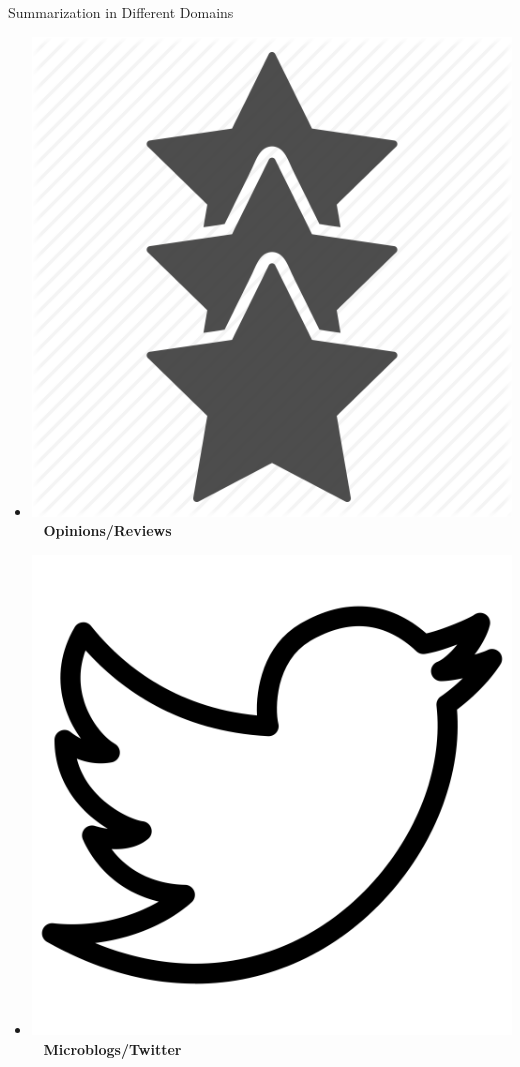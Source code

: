 \documentclass[xcolor={table}]{beamer}
\begin{document}
\begin{frame}{Summarization in Different Domains}
\begin{itemize}
\item[] \includegraphics[scale=.02]{rating_icon}~ \textbf{Opinions/Reviews} {\tiny\cite{titov2008joint}}
\item[] \includegraphics[scale=.02]{tweet_icon}~ \textbf{Microblogs/Twitter} {\tiny\cite{liu2011sxsw}}

\end{itemize}
\end{frame}
\end{document}
